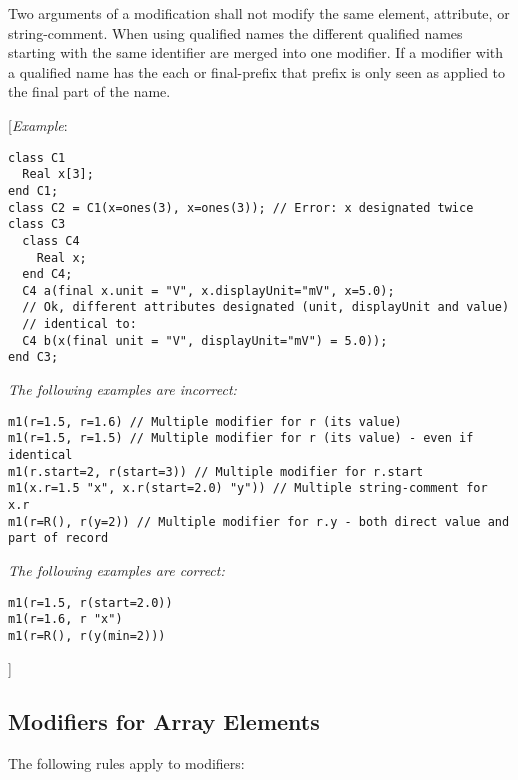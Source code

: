 Two arguments of a modification shall not modify the same element,
attribute, or string-comment. When using qualified names the different
qualified names starting with the same identifier are merged into one
modifier. If a modifier with a qualified name has the each or
final-prefix that prefix is only seen as applied to the final part of
the name.

{[}\emph{Example}:
\begin{lstlisting}[language=modelica]
class C1
  Real x[3];
end C1;
class C2 = C1(x=ones(3), x=ones(3)); // Error: x designated twice
class C3
  class C4
    Real x;
  end C4;
  C4 a(final x.unit = "V", x.displayUnit="mV", x=5.0);
  // Ok, different attributes designated (unit, displayUnit and value)
  // identical to:
  C4 b(x(final unit = "V", displayUnit="mV") = 5.0));
end C3;
\end{lstlisting}

\emph{The following examples are incorrect:}
\begin{lstlisting}[language=modelica]
m1(r=1.5, r=1.6) // Multiple modifier for r (its value)
m1(r=1.5, r=1.5) // Multiple modifier for r (its value) - even if identical
m1(r.start=2, r(start=3)) // Multiple modifier for r.start
m1(x.r=1.5 "x", x.r(start=2.0) "y")) // Multiple string-comment for x.r
m1(r=R(), r(y=2)) // Multiple modifier for r.y - both direct value and part of record
\end{lstlisting}
\emph{The following examples are correct:}
\begin{lstlisting}[language=modelica]
m1(r=1.5, r(start=2.0))
m1(r=1.6, r "x")
m1(r=R(), r(y(min=2)))
\end{lstlisting}
{]}

\subsection{Modifiers for Array Elements}

The following rules apply to modifiers:

